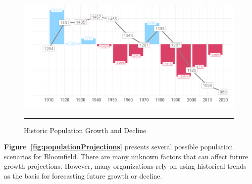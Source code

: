 \begin{figure}[H]
\centering
\begin{framed}
    \caption{Historic Population Growth and Decline}
    \label{fig:historicPop}
    \includegraphics[width=\linewidth]{figures/historical_population_trends.png}
    \rule[-5pt]{\linewidth}{0.4pt}
\end{framed}
\end{figure}


\noindent \textbf{Figure~\ref{fig:populationProjections}} presents several possible population scenarios for Bloomfield. There are many unknown factors that can affect future growth projections. However, many organizations rely on using historical trends as the basis for forecasting future growth or decline.\\

